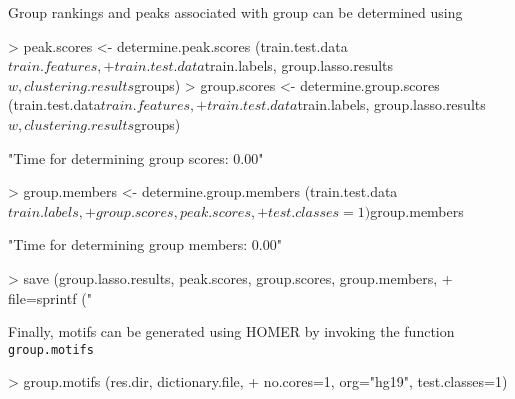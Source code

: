 \documentclass[10pt,oneside]{article}
\begin{document}
Group rankings and peaks associated with group can be determined using 
\begin{Schunk}
\begin{Sinput}
> peak.scores <- determine.peak.scores (train.test.data$train.features, 
+ 	train.test.data$train.labels, group.lasso.results$w, clustering.results$groups)
> group.scores <- determine.group.scores (train.test.data$train.features, 
+ 	train.test.data$train.labels, group.lasso.results$w, clustering.results$groups)
\end{Sinput}
\begin{Soutput}
[1] "Time for determining group scores: 0.00"
\end{Soutput}
\begin{Sinput}
> group.members <- determine.group.members  (train.test.data$train.labels, 
+ 	group.scores, peak.scores, 
+ 	test.classes=1)$group.members
\end{Sinput}
\begin{Soutput}
[1] "Time for determining group members: 0.00"
\end{Soutput}
\begin{Sinput}
> save (group.lasso.results, peak.scores, group.scores, group.members,
+ 	file=sprintf ("%s/group_lasso_results.Rdata", res.dir))
\end{Sinput}
\end{Schunk}

Finally, motifs can be generated using HOMER by invoking the function \texttt{group.motifs}
\begin{Schunk}
\begin{Sinput}
> group.motifs (res.dir, dictionary.file,
+ 	no.cores=1, org="hg19", test.classes=1)
\end{Sinput}
\end{Schunk}
\end{document}
